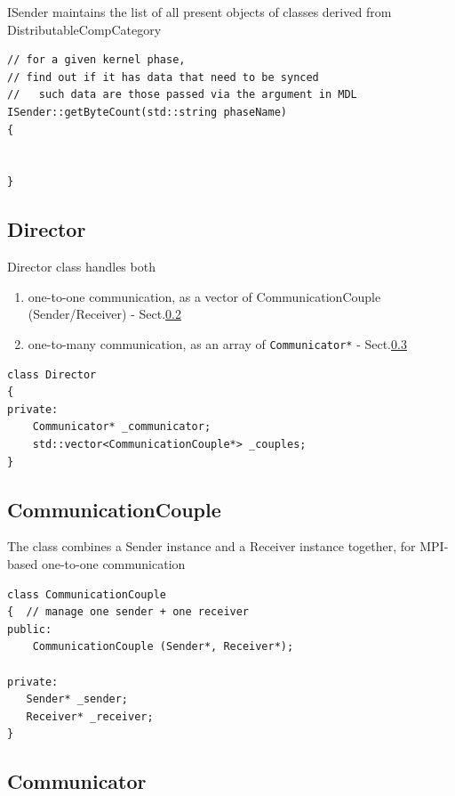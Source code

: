 ISender maintains the list of all present objects of
classes derived from DistributableCompCategory

\begin{verbatim}
// for a given kernel phase, 
// find out if it has data that need to be synced 
//   such data are those passed via the argument in MDL
ISender::getByteCount(std::string phaseName)
{
   

}
\end{verbatim}

\subsection{Director}
\label{sec:Director-MPI}

Director class handles both
\begin{enumerate}
  \item one-to-one communication, as a vector of CommunicationCouple
  (Sender/Receiver) - Sect.\ref{sec:CommunicationCouple-MPI}
  
  \item one-to-many communication, as an array of \verb!Communicator*!
  - Sect.\ref{sec:Communicator-MPI}
\end{enumerate}

\begin{verbatim}
class Director
{
private:
    Communicator* _communicator;
    std::vector<CommunicationCouple*> _couples;
}
\end{verbatim}

\subsection{CommunicationCouple}
\label{sec:CommunicationCouple-MPI}

The class combines a Sender instance and a Receiver instance together, for
MPI-based one-to-one communication

\begin{verbatim}
class CommunicationCouple
{  // manage one sender + one receiver
public:
    CommunicationCouple (Sender*, Receiver*);
    
private:
   Sender* _sender;
   Receiver* _receiver;
}
\end{verbatim}

\subsection{Communicator}
\label{sec:Communicator-MPI}


